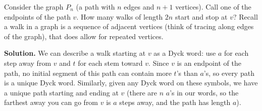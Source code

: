 \documentclass{book}
\begin{document}
\setcounter{project}{192}
\addtocounter{project}{-1}
\begin{activity}[]\label{activity-185}
\hypertarget{p-1119}{}%
Consider the graph \(P_n\) (a path with \(n\) edges and \(n+1\) vertices).  Call one of the endpoints of the path \(v\).  How many walks of length \(2n\) start and stop at \(v\)?  Recall a walk in a graph is a sequence of adjacent vertices (think of tracing along edges of the graph), that does allow for repeated vertices.%
\par\smallskip%
\noindent\textbf{Solution.}\hypertarget{solution-122}{}\quad%
\hypertarget{p-1120}{}%
We can describe a walk starting at \(v\) as a Dyck word: use \(a\) for each step away from \(v\) and \(t\) for each stem toward \(v\).  Since \(v\) is an endpoint of the path, no initial segment of this path can contain more \(t\)'s than \(a\)'s, so every path is a unique Dyck word.  Similarly, given any Dyck word on these symbols, we have a unique path starting and ending at \(v\) (there are \(n\) \(a\)'s in our words, so the farthest away you can go from \(v\) is \(a\) steps away, and the path has length \(a\)).%
\end{activity}
\end{document}

